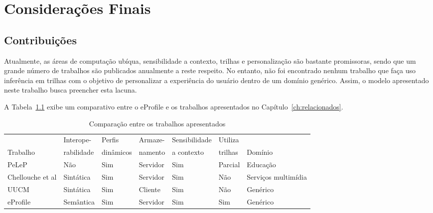 \chapter{Considerações Finais}
\label{ch:consideracoes}


\section{Contribuições}
\label{sec:contribuicoes}

Atualmente, as áreas de computação ubíqua, sensibilidade a contexto, trilhas e personalização são bastante promissoras, sendo que um grande número de trabalhos são publicados anualmente a reste respeito. No entanto, não foi encontrado nenhum trabalho que faça uso inferência em trilhas com o objetivo de personalizar a experiência do usuário dentro de um domínio genérico. Assim, o modelo apresentado neste trabalho busca preencher esta lacuna. 

A Tabela~\ref{tab:comparacao2} exibe um comparativo entre o eProfile e os trabalhos apresentados no Capítulo~\ref{ch:relacionados}.

\begin{table}\centering\footnotesize
  \begin{tabular*}{1\textwidth}{@{}lllllll@{}}
    \toprule
                                         & Interope-  & Perfis    & Armaze-  & Sensibilidade & Utiliza & \\
    Trabalho                             & rabilidade & dinâmicos & namento  & a contexto    & trilhas & Domínio \\
    \midrule
    PeLeP                                & Não        & Sim       & Servidor & Sim           & Parcial & Educação \\
    Chellouche et al                     & Sintática  & Sim       & Servidor & Sim           & Não     & Serviços multimídia \\
    UUCM                                 & Sintática  & Sim       & Cliente  & Sim           & Não     & Genérico \\
    eProfile                             & Semântica  & Sim       & Servidor & Sim           & Sim     & Genérico \\
    \bottomrule
  \end{tabular*}
  \caption{Comparação entre os trabalhos apresentados}
  \label{tab:comparacao2}
\end{table}

